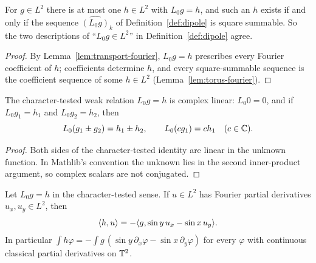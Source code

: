 \begin{lemma}
\label{lem:transport-l2}
\leanok
For $g\in L^2$ there is at most one $h\in L^2$ with $L_0g=h$, and such an $h$
exists if and only if the sequence $\widehat{(L_0g)}_k$ of
Definition~\ref{def:dipole} is square summable. So the two descriptions of
``$L_0g\in L^2$'' in Definition~\ref{def:dipole} agree.
\end{lemma}

\begin{proof}
\leanok
By Lemma~\ref{lem:transport-fourier}, $L_0g=h$ prescribes every Fourier
coefficient of $h$; coefficients determine $h$, and every square-summable
sequence is the coefficient sequence of some $h\in L^2$
(Lemma~\ref{lem:torus-fourier}).
\end{proof}

\begin{lemma}
\label{lem:L0-linearity}
\leanok
The character-tested weak relation $L_0g=h$ is complex linear:
$L_0 0=0$, and if $L_0g_1=h_1$ and $L_0g_2=h_2$, then
\[
 L_0(g_1\pm g_2)=h_1\pm h_2,\qquad
 L_0(cg_1)=ch_1 \quad(c\in\mathbb{C}).
\]
\end{lemma}

\begin{proof}
\leanok
Both sides of the character-tested identity are linear in the unknown
function. In Mathlib's convention the unknown lies in the second
inner-product argument, so complex scalars are not conjugated.
\end{proof}

\begin{lemma}
\label{lem:L0-h1-tests}
\leanok
Let $L_0g=h$ in the character-tested sense. If $u\in L^2$ has Fourier partial derivatives
$u_x,u_y\in L^2$, then
\[
 \langle h,u\rangle=-\langle g,\sin y\,u_x-\sin x\,u_y\rangle.
\]
In particular $\int h\varphi=-\int g\,(\sin y\,\partial_x\varphi-\sin x\,\partial_y\varphi)$
for every $\varphi$ with continuous classical partial derivatives on $\mathbb{T}^2$.
\end{lemma}


